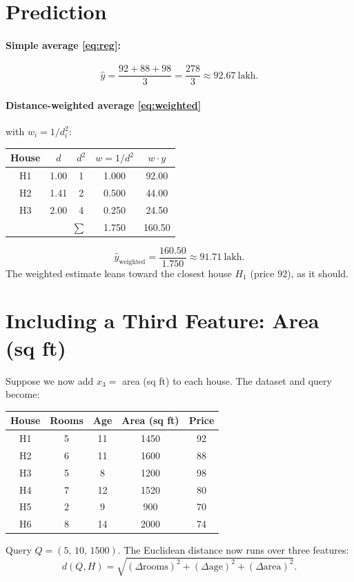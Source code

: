 \documentclass[11pt,a4paper]{report}
\theoremstyle{definition}
\theoremstyle{remark}
\begin{document}
	\section{Prediction}
	\paragraph{Simple average \eqref{eq:reg}:}
	\[
	\hat y=\frac{92+88+98}{3}=\frac{278}{3}\approx \boxed{92.67\ \text{lakh}.}
	\]
	\paragraph{Distance-weighted average \eqref{eq:weighted}} with $w_i=1/d_i^2$:
	\begin{center}
		\begin{tabular}{@{}ccccc@{}}
			\toprule
			House & $d$ & $d^2$ & $w=1/d^2$ & $w\cdot y$\\
			\midrule
			H1 & 1.00 & 1 & 1.000 & 92.00\\
			H2 & 1.41 & 2 & 0.500 & 44.00\\
			H3 & 2.00 & 4 & 0.250 & 24.50\\
			\midrule
			\multicolumn{3}{r}{$\sum$} & 1.750 & 160.50\\
			\bottomrule
		\end{tabular}
	\end{center}
	\[
	\hat y_{\text{weighted}}=\frac{160.50}{1.750}\approx \boxed{91.71\ \text{lakh}.}
	\]
	The weighted estimate leans toward the closest house $H_1$ (price $92$), as it
	should.
	
	\section{Including a Third Feature: Area (sq ft)}
	Suppose we now add $x_3=$ area (sq ft) to each house. The dataset and query
	become:
	\begin{center}
		\renewcommand{\arraystretch}{1.2}
		\begin{tabular}{c c c c c}
			\toprule
			House & Rooms & Age & Area (sq ft) & Price\\
			\midrule
			H1 & 5 & 11 & 1450 & 92\\
			H2 & 6 & 11 & 1600 & 88\\
			H3 & 5 & 8  & 1200 & 98\\
			H4 & 7 & 12 & 1520 & 80\\
			H5 & 2 & 9  & 900  & 70\\
			H6 & 8 & 14 & 2000 & 74\\
			\bottomrule
		\end{tabular}
	\end{center}
	Query $Q=(5,\,10,\,1500)$. The Euclidean distance now runs over three features:
	\[
	d(Q,H)=\sqrt{(\Delta\text{rooms})^2+(\Delta\text{age})^2+(\Delta\text{area})^2}.
	\]
	
\end{document}
